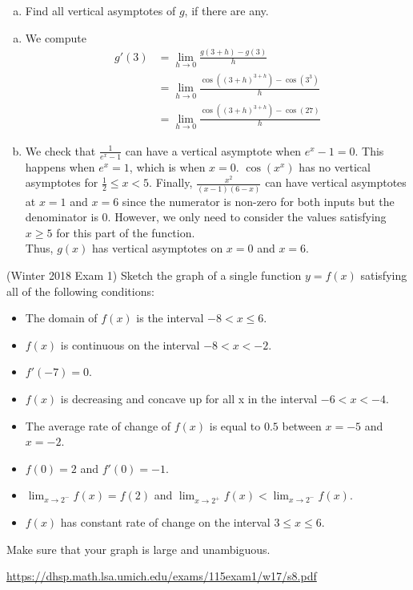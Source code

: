 \documentclass[11pt]{exam}
\begin{document}
\begin{questions}
\begin{enumerate}[(a)]
\item Find all vertical asymptotes of $g$, if there are any.
\end{enumerate}
\begin{solution}
  \begin{enumerate}[(a)]
  \item We compute
    \begin{align*}
      g'(3)
      & = \lim_{h \to 0}  \frac{g(3+h)-g(3)}{h} \\
      & = \lim_{h \to 0} \frac{\cos((3+h)^{3+h})-\cos(3^3)}{h}\\
      & = \lim_{h \to 0} \frac{\cos((3+h)^{3+h})-\cos(27)}{h}
    \end{align*}
  \item We check that \(\frac{1}{e^x-1}\) can have a vertical
    asymptote when \(e^x-1 = 0\). This happens when \(e^x = 1\), which
    is when \(x=0\). \(\cos(x^x)\) has no vertical asymptotes for
    \(\frac{1}{2} \leq x < 5\). Finally, \(\frac{x^2}{(x-1)(6-x)}\)
    can have vertical asymptotes at \(x=1\) and \(x=6\) since the
    numerator is non-zero for both inputs but the denominator is
    \(0\). However, we only need to consider the values satisfying \(x
    \geq 5\) for this part of the function. \\

    Thus, \(g(x)\) has vertical asymptotes on \(x=0\) and \(x=6\).
  \end{enumerate}
\end{solution}
\vspace{1in}
\question (Winter 2018 Exam 1) 
Sketch the graph of a single function $y = f(x)$ satisfying all of the following conditions:
\begin{itemize}
\item The domain of $f(x)$ is the interval $-8< x \leqslant 6$.
\item $f(x)$ is continuous on the interval $-8< x <-2$.
\item $f'(-7)=0$.
\item $f(x)$ is decreasing and concave up for all x in the interval $-6 < x < -4$.
\item The average rate of change of $f(x)$ is equal to $0.5$ between $x=-5$ and $x=-2$.
\item $f(0)=2$ and $f'(0) = -1$.
\item $\displaystyle\lim_{x \rightarrow 2^-}  f(x) = f(2)$ and $\displaystyle\lim_{x \rightarrow 2^+}  f(x) < \displaystyle\lim_{x \rightarrow 2^-}  f(x)$.
\item $f(x)$ has constant rate of change on the interval $3 \leqslant x \leqslant 6$.
\end{itemize}
Make sure that your graph is large and unambiguous.
\begin{solution}
  \href{https://dhsp.math.lsa.umich.edu/exams/115exam1/w17/s8.pdf}{https://dhsp.math.lsa.umich.edu/exams/115exam1/w17/s8.pdf}
\end{solution}
\end{questions}
\end{document}
